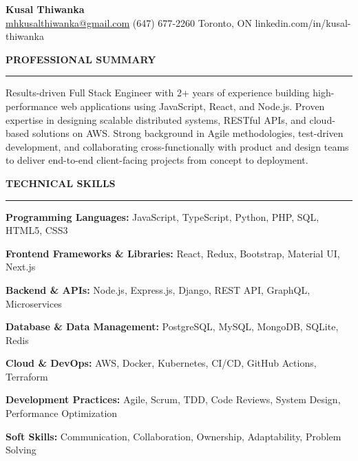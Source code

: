 \documentclass[10pt,letterpaper]{article}
\begin{document}
\begin{center}
{\LARGE\textbf{Kusal Thiwanka}}\\[3pt]
\href{mailto:mhkusalthiwanka@gmail.com}{mhkusalthiwanka@gmail.com}\hspace{2em}%
(647) 677{-}2260\hspace{2em}%
Toronto, ON\hspace{2em}
linkedin.com/in/kusal-thiwanka
\end{center}

\vspace{6pt}

\textbf{PROFESSIONAL SUMMARY}\\[-8pt]
\noindent\rule{\textwidth}{1pt}

\vspace{-2pt}

Results-driven Full Stack Engineer with 2+ years of experience building high-performance web applications using JavaScript, React, and Node.js. Proven expertise in designing scalable distributed systems, RESTful APIs, and cloud-based solutions on AWS. Strong background in Agile methodologies, test-driven development, and collaborating cross-functionally with product and design teams to deliver end-to-end client-facing projects from concept to deployment.

\vspace{8pt}

\textbf{TECHNICAL SKILLS}\\[-8pt]
\noindent\rule{\textwidth}{1pt}

\vspace{-2pt}

\textbf{Programming Languages:} JavaScript, TypeScript, Python, PHP, SQL, HTML5, CSS3

\textbf{Frontend Frameworks \& Libraries:} React, Redux, Bootstrap, Material UI, Next.js

\textbf{Backend \& APIs:} Node.js, Express.js, Django, REST API, GraphQL, Microservices

\textbf{Database \& Data Management:} PostgreSQL, MySQL, MongoDB, SQLite, Redis

\textbf{Cloud \& DevOps:} AWS, Docker, Kubernetes, CI/CD, GitHub Actions, Terraform

\textbf{Development Practices:} Agile, Scrum, TDD, Code Reviews, System Design, Performance Optimization

\textbf{Soft Skills:} Communication, Collaboration, Ownership, Adaptability, Problem Solving
\end{document}
